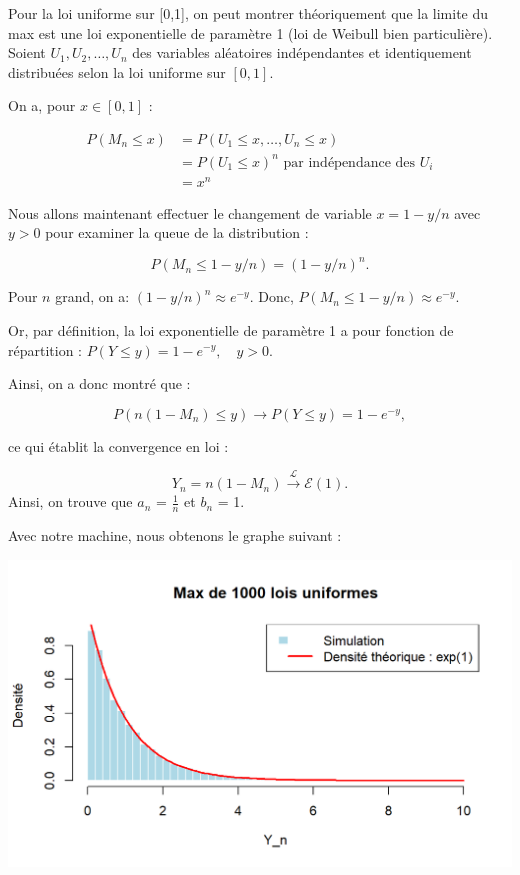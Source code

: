 \documentclass{article}
\begin{document}
\noindent Pour la loi uniforme sur [0,1], on peut montrer théoriquement que la limite du max est une loi exponentielle de paramètre 1 (loi de Weibull bien particulière). \\
\noindent Soient \( U_1, U_2, \dots, U_n \) des variables aléatoires indépendantes et identiquement distribuées selon la loi uniforme sur \([0,1]\).

\noindent On a, pour $ x \in [0,1]$ :

\begin{align*}
	P(M_n \leq x) &= P(U_1 \leq x, \dots, U_n \leq x) \\
	&= P(U_1 \leq x)^n \text{ par indépendance des $U_i$}\\
	&= x^n
\end{align*}

\noindent Nous allons maintenant effectuer le changement de variable $ x = 1 - y/n $ avec $y > 0 $ pour examiner la queue de la distribution :

\[
P(M_n \leq 1 - y/n) = (1 - y/n)^n.
\]

\noindent Pour $ n $ grand, on a: $(1 - y/n)^n \approx e^{-y} $. Donc, $ P(M_n \leq 1 - y/n) \approx e^{-y} $.


\noindent Or, par définition, la loi exponentielle de paramètre 1 a pour fonction de répartition : $ P(Y \leq y) = 1 - e^{-y}, \quad y > 0. $

\noindent Ainsi, on a donc montré que :

\[
P(n(1 - M_n) \leq y) \to P(Y \leq y) = 1 - e^{-y},
\]

\noindent ce qui établit la convergence en loi :

\[
Y_n = n(1 - M_n) \xrightarrow{\mathcal{L}} \mathcal{E}(1).
\] 
\noindent Ainsi, on trouve que $a_n$ = $\frac{1}{n}$ et $b_n$ = 1.

\noindent Avec notre machine, nous obtenons le graphe suivant :

\begin{center}
	\includegraphics[scale=0.8]{./Codes_R/Max_Uniforme.png} 
\end{center}
\end{document}
